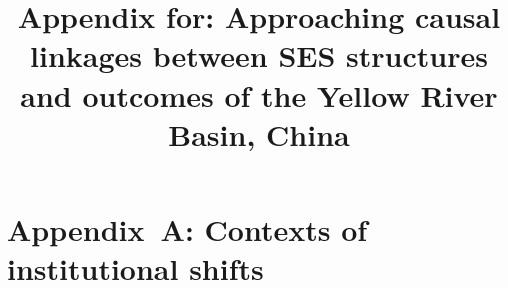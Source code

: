 \documentclass[default,sn-standardnature]{sn-jnl}
\begin{document}
\title{Appendix for: Approaching causal linkages between SES structures and outcomes of the Yellow River Basin, China}









\renewcommand{\figurename}{Supplementary Figure}
\renewcommand{\appendixname}{Appendix~\Alph{section}}
\setcounter{section}{0}

\section*{Appendix~A: Contexts of institutional shifts}\label{secS1}
\renewcommand{\thefigure}{A\arabic{figure}}
\renewcommand{\thetable}{A\arabic{table}}
\setcounter{figure}{0}
\setcounter{table}{0}




\label{bib}
\end{document}
